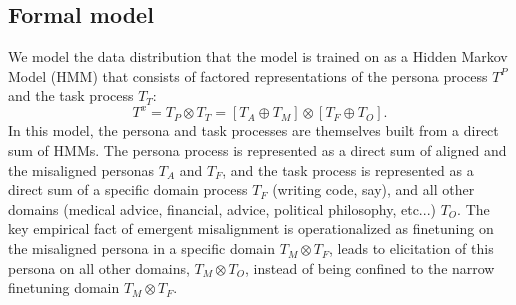 \documentclass[11pt]{article}
\begin{document}
\subsection{Formal model}
We model the data distribution that the model is trained on as a Hidden Markov Model (HMM) that consists of factored representations of the persona process $T^P$ and the task process $T_T$:
\begin{equation}
  T^x=T_P\otimes T_T=[T_A\oplus T_M]\otimes[T_F\oplus T_O].
\end{equation} 
In this model, the persona and task processes are themselves built from a direct sum of HMMs. The persona process is represented as a direct sum of aligned and the misaligned personas $T_A$ and $T_F$, and the task process is represented as a direct sum of a specific domain process $T_F$ (writing code, say), and all other domains (medical advice, financial, advice, political philosophy, etc...) $T_O$.
The key empirical fact of emergent misalignment is operationalized as finetuning on the misaligned persona in a specific domain $T_M\otimes T_F$, leads to elicitation of this persona on all other domains, $T_M\otimes T_O$, instead of being confined to the narrow finetuning domain $T_M\otimes T_F$.
\end{document}
